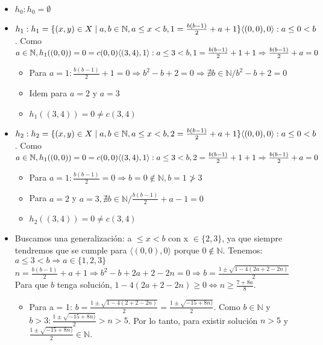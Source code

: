 \documentclass{article}
\begin{document}
\begin{itemize}
    \item \(h_0 : h_0 = \emptyset\)
    \item \(h_1 : h_1 = \{(x, y) \in X \mid a, b \in \mathbb N, a \leq x < b, 1 = \frac{b(b-1)}{2}+ a + 1\}
    \\ \langle(0, 0), 0\rangle : a \leq 0 < b\). Como \(a \in \mathbb N, h_1 ((0, 0)) = 0 = c(0, 0)
    \\ \langle(3, 4), 1\rangle : a \leq 3 < b, 1 = \frac{b(b-1)}{2}+ 1 +1 \Rightarrow \frac{b(b-1)}{2} + a = 0\)
\begin{itemize}
    \item Para \(a = 1: \frac{b(b-1)}{2} +1 = 0 \Rightarrow b^2 - b + 2 = 0 \Rightarrow \nexists b \in \mathbb N / b^2 - b + 2 = 0\)
    \item Idem para \(a = 2\) y \(a = 3\)
    \item \(h_1 ((3, 4)) = 0 \neq c(3, 4)\)
\end{itemize}
    \item \(h_2 : h_2 = \{(x, y) \in X \mid a, b \in \mathbb N, a \leq x < b, 2 = \frac{b(b-1)}{2}+ a + 1\}
    \\ \langle(0, 0), 0\rangle : a \leq 0 < b\). Como \(a \in \mathbb N, h_1 ((0, 0)) = 0 = c(0, 0)
    \\ \langle(3, 4), 1\rangle : a \leq 3 < b, 2 = \frac{b(b-1)}{2}+ 1 +1 \Rightarrow \frac{b(b-1)}{2} + a = 0\)
\begin{itemize}
    \item Para \(a = 1: \frac{b(b-1)}{2} = 0 \Rightarrow b = 0 \notin \mathbb N, b = 1 \ngtr 3\)
    \item Para \(a =2\) y \(a=3, \nexists b \in \mathbb N / \frac{b(b-1)}{2}+a-1 = 0\)
    \item \(h_2((3, 4)) = 0 \neq c(3, 4)\)
\end{itemize}
    \item Buscamos una generalización: a \(\leq x < b\) con x \(\in \{2, 3\}\), ya que siempre tendremos que se cumple para \(\langle(0, 0), 0\rangle\) porque \(0 \notin \mathbb N\).
    Tenemos: \(a \leq 3 < b \Rightarrow a \in \{1, 2, 3\}\)
    \\\(n = \frac{b(b-1)}{2}+a+1 \Rightarrow b^2 -b+2a+2-2n = 0 \Rightarrow b = \frac{1\pm\sqrt{1-4(2a+2-2n)}}{2}\)
    \\Para que \(b\) tenga solución, \(1 -4(2a + 2 - 2n) \geq 0 \Leftrightarrow n \geq \frac{7+8a}{8}\).
    \begin{itemize}
        \item Para a = 1: \(b = \frac{1\pm\sqrt{1-4(2+2-2n)}}{2} = \frac{1\pm\sqrt{-15+8n)}}{2}\). Como \(b \in \mathbb N\) y \(b > 3:\frac{1\pm\sqrt{-15+8n)}}{2} > n > 5\). Por lo tanto, para existir solución \(n > 5\) y \(\frac{1\pm\sqrt{-15+8n)}}{2} \in \mathbb N\).

\end{itemize}
\end{itemize}
\end{document}
